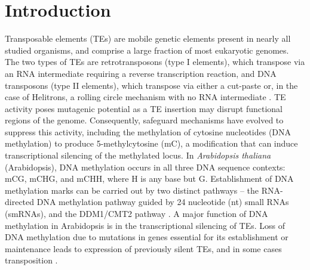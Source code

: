 \documentclass[12pt]{article}
\begin{document}
\section{Introduction}

Transposable elements (TEs) are mobile genetic elements present in
nearly all studied organisms, and comprise a large fraction of most
eukaryotic genomes. The two types of TEs are retrotransposons (type I
elements), which transpose via an RNA intermediate requiring a reverse
transcription reaction, and DNA transposons (type II elements), which
transpose via either a cut-paste or, in the case of Helitrons, a
rolling circle mechanism with no RNA intermediate
\cite{Wicker:2007en}. TE activity poses mutagenic potential as a TE
insertion may disrupt functional regions of the genome. Consequently,
safeguard mechanisms have evolved to suppress this activity, including
the methylation of cytosine nucleotides (DNA methylation) to produce
5-methylcytosine (mC), a modification that can induce transcriptional
silencing of the methylated locus. In \emph{Arabidopsis thaliana}
(Arabidopsis), DNA methylation occurs in all three DNA sequence
contexts: mCG, mCHG, and mCHH, where H is any base but
G. Establishment of DNA methylation marks can be carried out by two
distinct pathways -- the RNA-directed DNA methylation pathway guided
by 24 nucleotide (nt) small RNAs (smRNAs), and the DDM1/CMT2 pathway
\cite{Zemach:2013dj, Matzke:2014ek}. A major function of DNA
methylation in Arabidopsis is in the transcriptional silencing of
TEs. Loss of DNA methylation due to mutations in genes essential for
its establishment or maintenance leads to expression of previously
silent TEs, and in some cases transposition \cite{Mirouze:2009km,
  Miura:2001eg, Saze:2003du, Lippman:2004cm, Jeddeloh:1999gu,
  Zemach:2013dj}.
\end{document}
